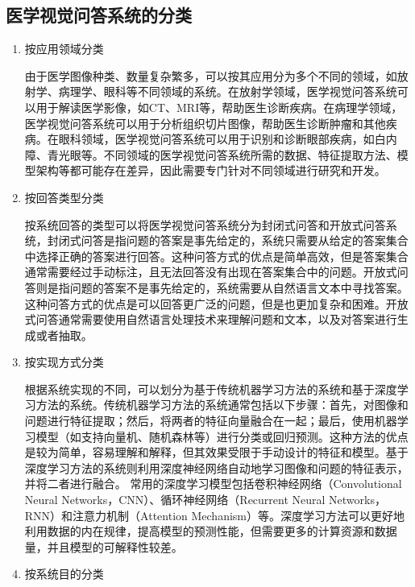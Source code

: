 \subsection{医学视觉问答系统的分类}
\begin{enumerate}[topsep = 0 pt, itemsep= 0 pt, parsep=0pt, partopsep=0pt, leftmargin=0pt, itemindent=44pt, labelsep=6pt, listparindent=22pt, label=(\arabic*)]
    \item 按应用领域分类
	
	由于医学图像种类、数量复杂繁多，可以按其应用分为多个不同的领域，如放射学、病理学、眼科等不同领域的系统。在放射学领域，医学视觉问答系统可以用于解读医学影像，如CT、MRI等，帮助医生诊断疾病。在病理学领域，医学视觉问答系统可以用于分析组织切片图像，帮助医生诊断肿瘤和其他疾病。在眼科领域，医学视觉问答系统可以用于识别和诊断眼部疾病，如白内障、青光眼等。不同领域的医学视觉问答系统所需的数据、特征提取方法、模型架构等都可能存在差异，因此需要专门针对不同领域进行研究和开发。
    \item 按回答类型分类
	
	按系统回答的类型可以将医学视觉问答系统分为封闭式问答和开放式问答系统，封闭式问答是指问题的答案是事先给定的，系统只需要从给定的答案集合中选择正确的答案进行回答。这种问答方式的优点是简单高效，但是答案集合通常需要经过手动标注，且无法回答没有出现在答案集合中的问题。开放式问答则是指问题的答案不是事先给定的，系统需要从自然语言文本中寻找答案。这种问答方式的优点是可以回答更广泛的问题，但是也更加复杂和困难。开放式问答通常需要使用自然语言处理技术来理解问题和文本，以及对答案进行生成或者抽取。
    \item 按实现方式分类
	
	根据系统实现的不同，可以划分为基于传统机器学习方法的系统和基于深度学习方法的系统。传统机器学习方法的系统通常包括以下步骤：首先，对图像和问题进行特征提取；然后，将两者的特征向量融合在一起；最后，使用机器学习模型（如支持向量机、随机森林等）进行分类或回归预测。这种方法的优点是较为简单，容易理解和解释，但其效果受限于手动设计的特征和模型。基于深度学习方法的系统则利用深度神经网络自动地学习图像和问题的特征表示，并将二者进行融合。
    常用的深度学习模型包括卷积神经网络（Convolutional Neural Networks，CNN）、循环神经网络（Recurrent Neural Networks，RNN）和注意力机制（Attention Mechanism）等。深度学习方法可以更好地利用数据的内在规律，提高模型的预测性能，但需要更多的计算资源和数据量，并且模型的可解释性较差。
    \item 按系统目的分类
	

\end{enumerate}
